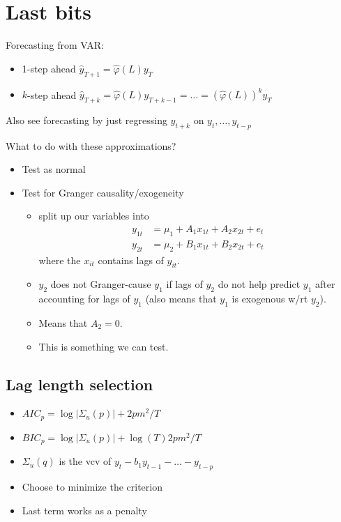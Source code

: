 \section{Last bits}

Forecasting from VAR:
\begin{itemize}
\item 1-step ahead $\hat y_{T+1} = \hat φ(L) y_T$
\item $k$-step ahead $\hat y_{T+k} = \hat φ(L) y_{T+k-1} = … = ( \hat
  φ(L) )^k y_T$
\end{itemize}
Also see forecasting by just regressing $y_{t+k}$ on $y_t,…,y_{t-p}$

What to do with these approximations?
\begin{itemize}
\item Test as normal
\item Test for Granger causality/exogeneity
  \begin{itemize}
  \item split up our variables into
    \begin{align*}
      y_{1t} &= μ_1 + A_1 x_{1t} + A_2 x_{2t} + e_t \\
      y_{2t} &= μ_2 + B_1 x_{1t} + B_2 x_{2t} + e_t
    \end{align*}
    where the $x_{it}$ contains lags of $y_{it}$.
  \item $y_2$ does not Granger-cause $y_1$ if lags of $y_2$ do not
    help predict $y_1$ after accounting for lags of $y_1$ (also means
    that $y_1$ is exogenous w/rt $y_2$).
  \item Means that $A_2 = 0$.
  \item This is something we can test.
  \end{itemize}
\end{itemize}

\subsection{Lag length selection}

\begin{itemize}
\item $AIC_p = \log | Σ_u(p)| + 2 p m^2 / T$
\item $BIC_p = \log | Σ_u(p)| + \log(T) 2 p m^2 / T$
\item $Σ_u(q)$ is the vcv of $y_t - b_1 y_{t-1} - … - y_{t-p}$
\item Choose to minimize the criterion
\item Last term works as a penalty
\end{itemize}

